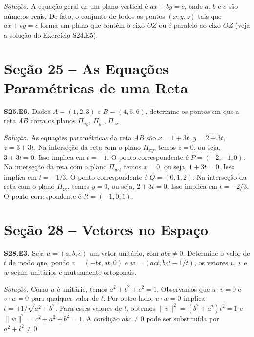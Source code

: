 \documentclass[a4paper,11pt]{article}
\begin{document}
\vspace{\baselineskip}

\emph{Solução.}
A equação geral de um plano vertical é $ax + by = c$, onde $a$, $b$ e $c$ são números reais.
De fato, o conjunto de todos os pontos $(x,y,z)$ tais que $ax + by = c$ forma um plano que contém o eixo $OZ$ ou é paralelo ao eixo $OZ$ (veja a solução do Exercício S24.E5).

\section*{Seção 25 -- As Equações Paramétricas de uma Reta}

\textbf{S25.E6.}
Dados $A = (1,2,3)$ e $B = (4,5,6)$, determine os pontos em que a reta $AB$ corta os planos $\Pi_{xy}$, $\Pi_{yz}$, $\Pi_{zx}$.

\vspace{\baselineskip}

\emph{Solução.}
As equações paramétricas da reta $AB$ são $x = 1 + 3t$, $y = 2 + 3t$, $z = 3 + 3t$.
Na interseção da reta com o plano $\Pi_{xy}$, temos $z = 0$, ou seja, $3 + 3t = 0$.
Isso implica em $t = -1$.
O ponto correspondente é $P = (-2,-1,0)$.
Na interseção da reta com o plano $\Pi_{yz}$, temos $x = 0$, ou seja, $1 + 3t = 0$.
Isso implica em $t = -1/3$.
O ponto correspondente é $Q = (0,1,2)$.
Na interseção da reta com o plano $\Pi_{zx}$, temos $y = 0$, ou seja, $2 + 3t = 0$.
Isso implica em $t = -2/3$.
O ponto correspondente é $R = (-1,0,1)$.

\section*{Seção 28 -- Vetores no Espaço}

\textbf{S28.E3.}
Seja $u = (a, b, c)$ um vetor unitário, com $abc \neq 0$.
Determine o valor de $t$ de modo que, pondo $v = (-bt, at, 0)$ e $w = (act, bct -1/t)$, os vetores $u$, $v$ e $w$ sejam unitários e mutuamente ortogonais.

\vspace{\baselineskip}

\emph{Solução.}
Como $u$ é unitário, temos $a^2 + b^2 + c^2 = 1$.
Observamos que $u \cdot v = 0$ e $v \cdot w = 0$ para qualquer valor de $t$.
Por outro lado, $u \cdot w = 0$ implica $t = \pm 1/\sqrt{a^2 + b^2}$.
Para esses valores de $t$, obtemos $\| v \|^2 = (b^2 + a^2)t^2 = 1$ e $\| w \|^2 = c^2 + a^2 + b^2 = 1$.
A condição $abc \neq 0$ pode ser substituída por $a^2 + b^2 \neq 0$.
\end{document}

